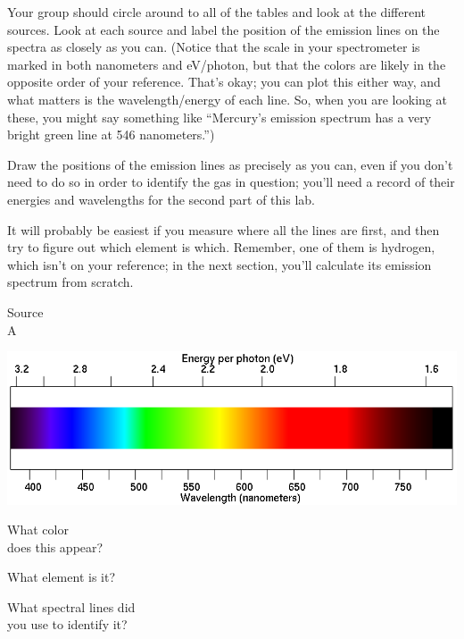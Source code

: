 \documentclass[11pt]{article}
\begin{document}
Your group should circle around to all of the tables and look at the different sources. Look at each source and label the position of 
the emission lines on the spectra as closely as you can. (Notice that the scale in your spectrometer is marked in both nanometers and eV/photon, but that the colors are likely in the opposite order of your reference. That's okay; you can plot this either way, and what matters is the wavelength/energy of each line. So, when you are looking at these, you might say something like ``Mercury's emission spectrum has a very bright green line at 546 nanometers.'') 

Draw the positions of the emission lines as precisely as you can, even if you don't need to do so in order
to identify the gas in question; you'll need a record of their energies and wavelengths for the second part of this lab.

It will probably be easiest if you measure where all the lines are first, and then try to figure out which
element is which. Remember, one of them is hydrogen, which isn't on your reference; in the next section, you'll calculate its emission spectrum from scratch.


\begin{minipage}{0.1\textwidth}
	\begin{center}
		\Large Source \\ A
	\end{center}
\end{minipage}
\begin{minipage}{0.7\textwidth}
	\includegraphics[width=\textwidth]{spectrum2.png}
\end{minipage}

\begin{minipage}{0.33\textwidth}
	What color \\does this appear?
\end{minipage}
\begin{minipage}{0.33\textwidth}
	What element is it?
\end{minipage}
\begin{minipage}{0.33\textwidth}
	What spectral lines did\\
	you use to identify it?
\end{minipage}
\end{document}
